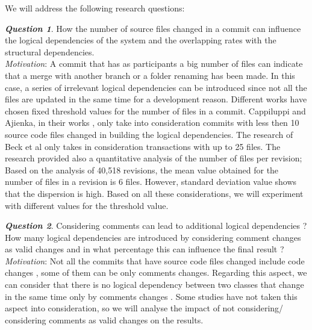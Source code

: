 \documentclass[conference]{IEEEtran}
\begin{document}
We will address the following research questions:

\textit{\textbf{Question 1}}. How the number of source files changed in a commit can influence the logical dependencies of the system and the overlapping rates with the structural dependencies.\\
\textit{Motivation}: A commit that has as participants a big number of files can indicate that a merge with another branch or a folder renaming has been made. In this case, a series of irrelevant logical dependencies can be introduced since not all the files are updated in the same time for a development reason. Different works have chosen fixed threshold values for the number of files in a commit. Cappiluppi and Ajienka, in their works \cite{DBLP:journals/jss/AjienkaC17}, \cite{DBLP:journals/ese/AjienkaCC18} only take into consideration commits with less then 10 source code files changed in building the logical dependencies. The research of Beck et al \cite{Beck:2011:CMC:2025113.2025162} only takes in consideration transactions with up to 25 files. The research \cite{Oliva:2011:ISL:2067853.2068086} provided also a quantitative analysis of the number of files per revision; Based on the analysis of  40,518 revisions, the mean value obtained for the number of files in a revision is 6 files. However, standard deviation value shows that the dispersion is high. Based on all these considerations, we will experiment with different values for the threshold value. 



\textit{\textbf{Question 2}}. Considering comments can lead to additional logical dependencies ? How many logical dependencies are introduced by considering comment changes as valid changes and in what percentage this can influence the final result ?\\
\textit{Motivation}: Not all the commits that have source code files changed include code changes , some of them can be only comments changes. Regarding this aspect, we can consider that there is no logical dependency between two classes that change in the same time only by comments changes . Some studies have not taken this aspect into consideration, so we will analyse the impact of not considering/ considering comments as valid changes on the results. 
\end{document}
